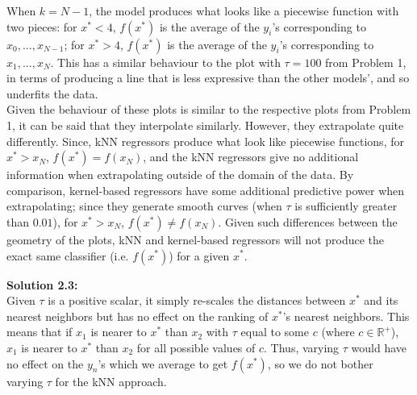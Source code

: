 \documentclass[submit]{harvardml}
\begin{document}
\noindent When $k = N-1$, the model produces what looks like a piecewise function with two pieces: for $x^*<4$, $f(x^*)$ is the average of the $y_i$'s corresponding to $x_0, ..., x_{N-1}$; for $x^*>4$, $f(x^*)$ is the average of the $y_i$'s corresponding to $x_1, ..., x_N$. This has a similar behaviour to the plot with $\tau = 100$ from Problem 1, in terms of producing a line that is less expressive than the other models', and so underfits the data.\\

\noindent Given the behaviour of these plots is similar to the respective plots from Problem 1, it can be said that they interpolate similarly. However, they extrapolate quite differently. Since, kNN regressors produce what look like piecewise functions, for $x^*>x_N$, $f(x^*)=f(x_N)$, and the kNN regressors give no additional information when extrapolating outside of the domain of the data. By comparison, kernel-based regressors have some additional predictive power when extrapolating; since they generate smooth curves (when $\tau$ is sufficiently greater than $0.01$), for $x^*>x_N$, $f(x^*) \ne f(x_N)$. Given such differences between the geometry of the plots, kNN and kernel-based regressors will not produce the exact same classifier (i.e. $f(x^*)$) for a given $x^*$.

\bigskip
\noindent\textbf{Solution 2.3:}\\
Given $\tau$ is a positive scalar, it simply re-scales the distances between $x^*$ and its nearest neighbors but has no effect on the ranking of $x^*$'s nearest neighbors. This means that if $x_1$ is nearer to $x^*$ than $x_2$ with $\tau$ equal to some $c$ (where $c \in \mathbb{R}^{+}$), $x_1$ is nearer to $x^*$ than $x_2$ for all possible values of $c$. Thus, varying $\tau$ would have no effect on the $y_n$'s which we average to get $f(x^*)$, so we do not bother varying $\tau$ for the kNN approach.

\newpage 

\end{document}
